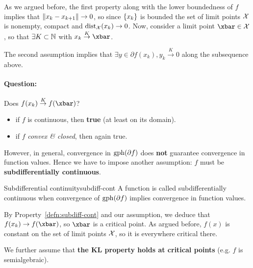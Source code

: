 As we argued before, the first property along with the lower boundedness of $f$
implies that $\left \| x_k - x_{k+1} \right \| \to 0$, so since $\left\{ x_k \right\}$ is bounded the
set of limit points $\mathcal{X}$ is nonempty, compact and $\mathrm{dist}_{\mathcal{X}}(x_k)
\to 0$. Now, consider a limit point $\xbar \in \cX$, so that $\exists K \subset
\mathbb{N}$ with $x_k \overset{K}{\to} \xbar$.

The second assumption implies that $\exists y \in \partial f(x_k), y_k
\overset{K}{\to} 0$ along the subsequence above.

\paragraph{Question:} Does $f(x_k) \overset{K}{\to} f(\xbar)$?
\begin{itemize}
\item if $f$ is continuous, then \textbf{true} (at least on its domain).
\item if $f$ \textit{convex \& closed}, then again true.
\end{itemize}

However, in general, convergence in $\mathrm{gph}{(\partial f)}$ does \textbf{not}
guarantee convergence in function values. Hence we have to impose another
assumption: $f$ must be \textbf{subdifferentially continuous}.

\begin{cdefinition}{Subdifferential continuity}{subdiff-cont}
    A function is called subdifferentially continuous when convergence of
    $\mathrm{gph}{(\partial f)}$ implies convergence in function values.
\end{cdefinition}


By Property~\ref{defn:subdiff-cont} and our assumption, we deduce that $f(x_k)
\to f(\xbar)$, so $\xbar$ is a critical point. As argued before, $f(x)$ is
constant on the set of limit points $\mathcal{X}$, so it is everywhere critical there.

We further assume that \textbf{the KL property holds at critical points} (e.g.
$f$ is semialgebraic).

